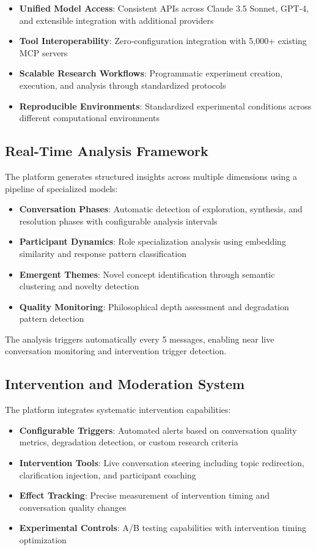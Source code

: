 \documentclass[11pt,letterpaper]{article}
\newcommand{\mcp}{MCP}
\begin{document}
\begin{itemize}
    \item \textbf{Unified Model Access}: Consistent APIs across Claude 3.5 Sonnet, GPT-4, and extensible integration with additional providers
    \item \textbf{Tool Interoperability}: Zero-configuration integration with 5,000+ existing \mcp{} servers
    \item \textbf{Scalable Research Workflows}: Programmatic experiment creation, execution, and analysis through standardized protocols
    \item \textbf{Reproducible Environments}: Standardized experimental conditions across different computational environments
\end{itemize}

\subsection{Real-Time Analysis Framework}

The platform generates structured insights across multiple dimensions using a pipeline of specialized models:

\begin{itemize}
    \item \textbf{Conversation Phases}: Automatic detection of exploration, synthesis, and resolution phases with configurable analysis intervals
    \item \textbf{Participant Dynamics}: Role specialization analysis using embedding similarity and response pattern classification
    \item \textbf{Emergent Themes}: Novel concept identification through semantic clustering and novelty detection
    \item \textbf{Quality Monitoring}: Philosophical depth assessment and degradation pattern detection
\end{itemize}

The analysis triggers automatically every 5 messages, enabling near live conversation monitoring and intervention trigger detection.

\subsection{Intervention and Moderation System}

The platform integrates systematic intervention capabilities:

\begin{itemize}
    \item \textbf{Configurable Triggers}: Automated alerts based on conversation quality metrics, degradation detection, or custom research criteria
    \item \textbf{Intervention Tools}: Live conversation steering including topic redirection, clarification injection, and participant coaching
    \item \textbf{Effect Tracking}: Precise measurement of intervention timing and conversation quality changes
    \item \textbf{Experimental Controls}: A/B testing capabilities with intervention timing optimization
\end{itemize}
\end{document}
